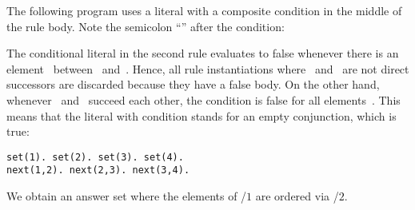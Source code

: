 \begin{example}\label{ex:sort}
The following program uses a literal with a composite condition in the middle of the rule body. 
Note the semicolon ``\code{;}'' after the condition:
%

%
The conditional literal in the second rule evaluates to false
whenever there is an element~ between~ and~.
Hence, all rule instantiations where~ and~ are not direct successors are discarded
because they have a false body.
On the other hand, whenever~ and~ succeed each other,
the condition is false for all elements~.
This means that the literal with condition stands for an empty conjunction, which is true:%
%
\begin{lstlisting}[numbers=none]
set(1). set(2). set(3). set(4).
next(1,2). next(2,3). next(3,4).
\end{lstlisting}
We obtain an answer set where the elements of /$1$ are ordered via /$2$.
\eexample
\end{example}


